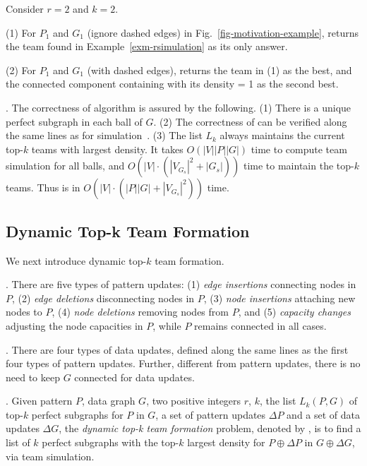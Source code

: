 {\begin{example}
\label{exa-alg-batch} Consider $r=2$ and $k=2$.

\sstab(1) For $P_1$ and $G_1$ (ignore dashed edges) in Fig.~\ref{fig-motivation-example},
 \grouprec returns the team found in Example~\ref{exm-rsimulation} as its only answer.

\sstab(2) For $P_1$ and $G_1$ (with dashed edges), \grouprec returns the team in (1) as the best,
and the connected component containing  with its density = 1 as the second best.
\end{example}


. The correctness of algorithm \grouprec is assured by the following.
(1) There is a unique perfect subgraph in each ball of $G$.
(2) The correctness of \rgraphsim can be verified along the same lines as for simulation~\cite{infsimu95}.
(3) The list $L_{k}$ always maintains the current top-$k$ teams with largest density.
It takes $O(|V||P||G|)$ time to compute team simulation for all balls,
and $O(|V|\cdot(|V_{G_s}|^2+|G_s|))$ time to maintain the top-$k$ teams.
Thus \grouprec is in $O(|V|\cdot(|P||G|+|V_{G_s}|^2))$ time.
}%


\subsection{Dynamic Top-k Team Formation}
\label{subsec-dynteamF}

We next introduce dynamic top-$k$ team formation.

. There are five types of pattern updates:
%
(1) {\em edge insertions} connecting nodes in $P$,
%
(2) {\em edge deletions} disconnecting nodes in $P$,
%
(3) {\em node insertions} attaching new nodes to $P$,
%
(4) {\em node deletions} removing nodes from $P$, and
%
(5) {\em capacity changes} adjusting the node capacities in $P$,
%
while $P$  remains connected in all cases.


. There are four types of data updates,
defined along the same lines as the first four types of pattern updates.
Further, different from pattern updates, there is no need to keep $G$ connected for data updates.


. Given pattern $P$, data graph $G$, two positive integers $r$, $k$, the list $L_{k}(P,G)$ of top-$k$ perfect subgraphs for $P$ in $G$,
a set of pattern updates $\Delta P$ and a set of data updates $\Delta G$,
the {\em dynamic top-k team formation} problem, denoted by ,
is to find a list of $k$ perfect subgraphs with the top-$k$ largest density for $P\oplus\Delta P$ in $G\oplus\Delta G$, via team simulation.

